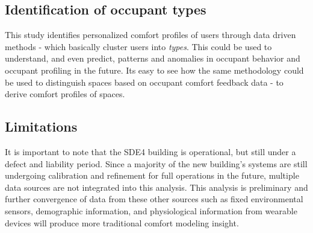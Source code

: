 

\subsection{Identification of occupant types}
This study identifies personalized comfort profiles of users through data driven methods - which basically cluster users into \emph{types}. This could be used to understand, and even predict, patterns and anomalies in occupant behavior and occupant profiling in the future. Its easy to see how the same methodology could be used to distinguish spaces based on occupant comfort feedback data - to derive comfort profiles of spaces.


\subsection{Limitations}
It is important to note that the SDE4 building is operational, but still under a defect and liability period. Since a majority of the new building's systems are still undergoing calibration and refinement for full operations in the future, multiple data sources are not integrated into this analysis. This analysis is preliminary and further convergence of data from these other sources such as fixed environmental sensors, demographic information, and physiological information from wearable devices will produce more traditional comfort modeling insight.   









